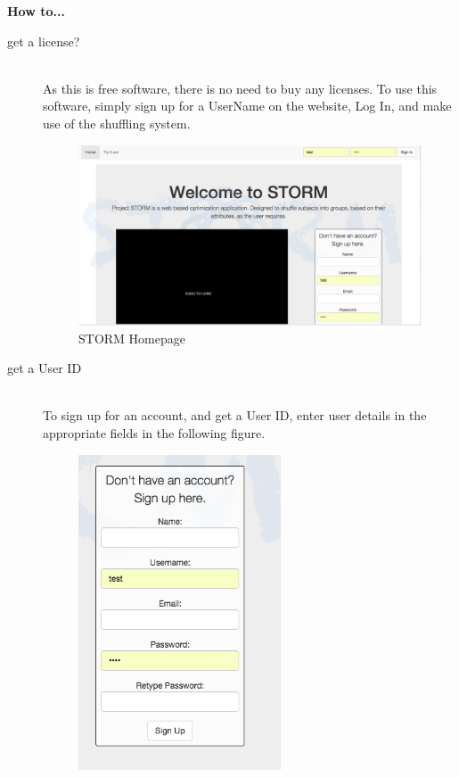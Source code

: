 {\Large \textbf{How to...} \par}

\begin{description}
 	\item[get a license?] \hfill \\
 		As this is free software, there is no need to buy any licenses. To use this software, simply 
		sign up for a UserName on the website, Log In, and make use of the shuffling system.
 		\begin{figure}[H] 
		 	\centering
			 \includegraphics[width=13cm]{./graphics/HomePage.jpg}
			 \caption{STORM Homepage}
		 \end{figure}
 	\item[get a User ID] \hfill \\
		To sign up for an account, and get a User ID, enter user details in the appropriate fields in the 		following figure.\par
		 \begin{figure}[H] 
		 \centering
		 \includegraphics[width=6cm]{./graphics/StormUMSU1.jpg}

\end{figure}
\end{description}
